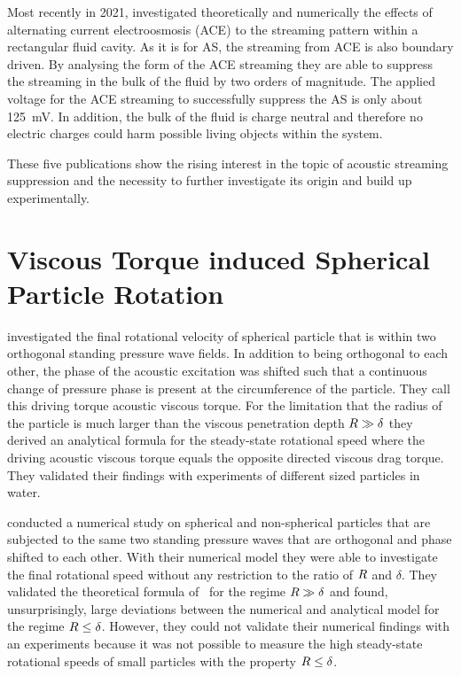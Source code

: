 Most recently in 2021,  investigated theoretically and 
numerically the effects of alternating current electroosmosis (ACE) to the 
streaming pattern within a rectangular fluid cavity. As it is for AS, the 
streaming from ACE is also boundary driven. By analysing the form of the ACE 
streaming they are able to suppress the streaming in the bulk of the fluid by 
two orders of magnitude. The applied voltage for the ACE streaming to 
successfully suppress the AS is only about \SI{125}{\milli\volt}. In addition, 
the bulk of the fluid is charge neutral and therefore no electric charges could 
harm possible living objects within the system.

These five publications show the rising interest in the topic of acoustic 
streaming suppression and the necessity to further investigate its origin and 
build up experimentally.

\section{Viscous Torque induced Spherical Particle Rotation}

 investigated the final rotational velocity of spherical 
particle that is within two orthogonal standing pressure wave fields. In 
addition to being orthogonal to each other, the phase of the acoustic 
excitation was shifted such that a continuous change of pressure phase is 
present at the circumference of the particle. They call this driving torque 
acoustic viscous torque. For the limitation that the radius of the particle is 
much larger than the viscous penetration depth $R\gg\delta$ they derived an 
analytical formula for the steady-state rotational speed where the driving 
acoustic viscous torque equals the opposite directed viscous drag torque. They 
validated their findings with experiments of different sized particles in 
water.

 conducted a numerical study on spherical and non-spherical 
particles that are subjected to the same two standing pressure waves that are 
orthogonal and phase shifted to each other. With their numerical model they 
were able to investigate the final rotational speed without any restriction to 
the ratio of $R$ and $\delta$. They validated the theoretical formula 
of~\cite{Lamprecht2015} for the regime $R\gg\delta$ and found, unsurprisingly, 
large deviations between the numerical and analytical model for the regime 
$R\leq\delta$. However, they could not validate their numerical findings with 
an experiments because it was not possible to measure the high steady-state 
rotational speeds of small particles with the property $R\leq\delta$.

